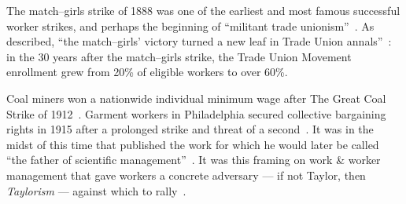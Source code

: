\documentclass[trackingWork]{subfiles}
\begin{document}
The match--girls strike of 1888 was one of the earliest and most famous successful worker strikes,
and perhaps the beginning of ``militant trade unionism''~\cite{10.2307/3827491}.
As \citeauthor{weyer1894history} described,
``the match--girls' victory turned a new leaf in Trade Union annals''~\cite{weyer1894history}: in the 30 years after the match--girls strike,
the Trade Union Movement enrollment grew from 20\% of eligible workers to over 60\%.

Coal miners won a nationwide individual minimum wage after The Great Coal Strike of 1912~\cite{10.2307/2221944}.
Garment workers in Philadelphia secured collective bargaining rights in 1915 after a prolonged strike and threat of a second~\cite{10.2307/41829256}.
It was in the midst of this time that \citeauthor{taylor1914principles} published
the work for which he would later be called ``the father of scientific management''~\cite{RePEc:mtp:titles:0262612062}.
It was this framing on work \& worker management that gave workers a concrete adversary
--- if not Taylor, then \textit{Taylorism}  ---
against which to rally~\cite{jacoby1983union,parker1920casual}.



\end{document}
